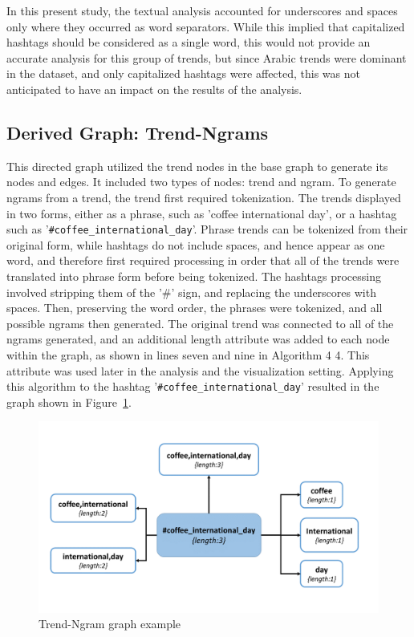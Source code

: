 \documentclass[conference]{IEEEtran}
\begin{document}
In this present study, the textual analysis accounted for underscores and spaces 
only where they occurred as word separators. While this implied that capitalized 
hashtags should be considered as a single word, this would not provide an accurate 
analysis for this group of trends, but since Arabic trends were dominant in the dataset, 
and only capitalized hashtags were affected, this was not anticipated to have an impact 
on the results of the analysis.


\subsection{Derived Graph: Trend-Ngrams}

This directed graph utilized the trend nodes in the base graph to generate its nodes and 
edges. It included two types of nodes: trend and ngram. To generate ngrams from a 
trend, the trend first required tokenization. The trends displayed in two forms, either as 
a phrase, such as 'coffee international day', or a hashtag such as '{\texttt{\#coffee\_international\_day}}'. 
Phrase trends can be tokenized from their original form, while hashtags do not include spaces, 
and hence appear as one word, and therefore first required processing in order that all of the 
trends were translated into phrase form before being tokenized. The hashtags processing 
involved stripping them of the '\#' sign, and replacing the underscores with spaces. Then, 
preserving the word order, the phrases were tokenized, and all possible ngrams then generated. 
The original trend was connected to all of the ngrams generated, and an additional length attribute 
was added to each node within the graph, as shown in lines seven and nine in Algorithm ‎4 4. 
This attribute was used later in the analysis and the visualization setting. Applying this 
algorithm to the hashtag '{\texttt{\#coffee\_international\_day}}' resulted in the graph shown 
in Figure~\ref{fig:tngraph}.

\begin{figure}[htb] \centering
\includegraphics[width=\columnwidth]{images/trend_ngram_example.png}
\caption{Trend-Ngram graph example}
\label{fig:tngraph}
\end{figure}
\end{document}
